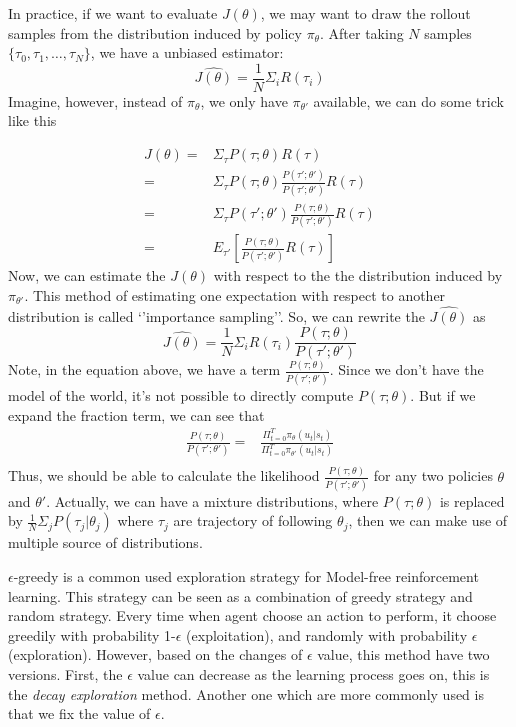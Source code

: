 \documentclass[9pt]{article}
\begin{document}
In practice, if we want to evaluate $J(\theta)$, we may want to draw the rollout samples from the distribution induced by policy $\pi_{\theta}$. After taking $N$ samples $\{\tau_0,\tau_1,\ldots,\tau_N\}$, we have a unbiased estimator:
\[
	\hat{J(\theta)} = \frac{1}{N}\Sigma_{i}R(\tau_i)
\]
Imagine, however, instead of $\pi_{\theta}$, we only have $\pi_{\theta'}$ available, we can do some trick like this
\begin{comment}
need to figure why can we ignore the dynamic model
\end{comment}
\[
\begin{split}
J(\theta) = & \Sigma_{\tau}P(\tau;\theta)R(\tau)\\
= & \Sigma_{\tau}P(\tau;\theta) \frac{P(\tau';\theta')}{P(\tau';\theta')} R(\tau)\\
= & \Sigma_{\tau}P(\tau';\theta') \frac{P(\tau;\theta)}{P(\tau';\theta')} R(\tau)\\
= & E_{\tau'}[\frac{P(\tau;\theta)}{P(\tau';\theta')} R(\tau)]
\end{split}
\]
Now, we can estimate the $J(\theta)$ with respect to the the distribution induced by $\pi_{\theta'}$. This method of estimating one expectation with respect to another distribution is called `'importance sampling''. So, we can rewrite the $\hat{J(\theta)}$ as
\[
\hat{J(\theta)} = \frac{1}{N}\Sigma_{i}R(\tau_i)\frac{P(\tau;\theta)}{P(\tau';\theta')}
\]
Note, in the equation above, we have a term $\frac{P(\tau;\theta)}{P(\tau';\theta')}$. Since we don't have the model of the world, it's not possible to directly compute $P(\tau;\theta)$. But if we expand the fraction term, we can see that 
\[
\begin{split}
\frac{P(\tau;\theta)}{P(\tau';\theta')} = & \frac{\Pi_{t=0}^T\pi_{\theta}(u_t|s_t)}{\Pi_{t=0}^T\pi_{\theta'}(u_t|s_t)}\\
\end{split}
\]
Thus, we should be able to calculate the likelihood $\frac{P(\tau;\theta)}{P(\tau';\theta')}$ for any two policies $\theta$
 and $\theta'$. Actually, we can have a mixture distributions, where $P(\tau;\theta)$ is replaced by $\frac{1}{N}\Sigma_jP(\tau_j|\theta_j)$ where $\tau_j$ are trajectory of following $\theta_j$, then we can make use of multiple source of distributions.


$\epsilon$-greedy is a common used exploration strategy for Model-free reinforcement learning. This strategy can be seen as a combination of greedy strategy and random strategy. Every time when agent choose an action to perform, it choose greedily with probability 1-$\epsilon$ (exploitation), and randomly with probability $\epsilon$ (exploration). However, based on the changes of $\epsilon$ value, this method have two versions. First, the $\epsilon$ value can decrease as the learning process goes on, this is the \textit{decay exploration} method. Another one which are more commonly used is that we fix the value of $\epsilon$. 
\end{document}
